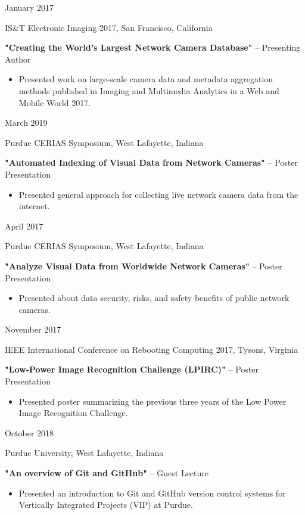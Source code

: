 \documentclass[10pt]{article}
\newlength{\cvcolumngapwidth}
\newlength{\cvleftcolumnwidth}
\newlength{\cvrightcolumnwidth}
\newcommand{\cvtitlestyle}[1]{{\large\cvtitlefont\textcolor{cvtitlecolor}{#1}}}
\newcommand{\cvdurationstyle}[1]{{\small\cvdurationfont\textcolor{cvdurationcolor}{#1}}}
\newlength{\cvafteritemskipamount}
\newlength{\cvparskip}
\newcommand{\cvitem}[2]{
    \begin{minipage}[t]{\cvleftcolumnwidth}
        \raggedleft #1
    \end{minipage}%
    \hspace{\cvcolumngapwidth}%
    \begin{minipage}[t]{\cvrightcolumnwidth}
        \setlength{\parskip}{\cvparskip} #2
    \end{minipage}

    \vspace{\cvafteritemskipamount}
}
\newcommand{\cvtitle}[1]{
    \cvtitlestyle{#1}

    \vspace{1mm plus 0.25mm minus 0.25mm}
    \vspace{-\cvparskip}
}
\begin{document}
\cvitem{
    \cvdurationstyle{January 2017}
}{
    \cvtitle{IS\&T Electronic Imaging 2017, San Francisco, California}

    \textbf{"Creating the World’s Largest Network Camera Database"} – Presenting Author

    \begin{itemize}[leftmargin=*]
        \item Presented work on large-scale camera data and metadata aggregation methods published in Imaging and Multimedia Analytics in a Web and Mobile World 2017.
    \end{itemize}
}

\cvitem{
    \cvdurationstyle{March 2019}
}{
    \cvtitle{Purdue CERIAS Symposium, West Lafayette, Indiana}

    \textbf{"Automated Indexing of Visual Data from Network Cameras"} – Poster Presentation

    \begin{itemize}[leftmargin=*]
        \item Presented general approach for collecting live network camera data from the internet.
    \end{itemize}
}

\cvitem{
    \cvdurationstyle{April 2017}
}{
    \cvtitle{Purdue CERIAS Symposium, West Lafayette, Indiana}
    
    \textbf{"Analyze Visual Data from Worldwide Network Cameras"} – Poster Presentation

    \begin{itemize}[leftmargin=*]
        \item Presented about data security, risks, and safety benefits of public network cameras.
    \end{itemize}
}

\cvitem{
    \cvdurationstyle{November 2017}
}{
    \cvtitle{IEEE International Conference on Rebooting Computing 2017, Tysons, Virginia}
    
  \textbf{"Low-Power Image Recognition Challenge (LPIRC)"} – Poster Presentation

    \begin{itemize}[leftmargin=*]
        \item Presented poster summarizing the previous three years of the Low Power Image Recognition Challenge.
    \end{itemize}
}

\cvitem{
    \cvdurationstyle{October 2018}
}{
    \cvtitle{Purdue University, West Lafayette, Indiana}
    
  \textbf{"An overview of Git and GitHub"} – Guest Lecture

    \begin{itemize}[leftmargin=*]
        \item Presented an introduction to Git and GitHub version control systems for Vertically Integrated Projects (VIP) at Purdue.
    \end{itemize}
}
\end{document}
